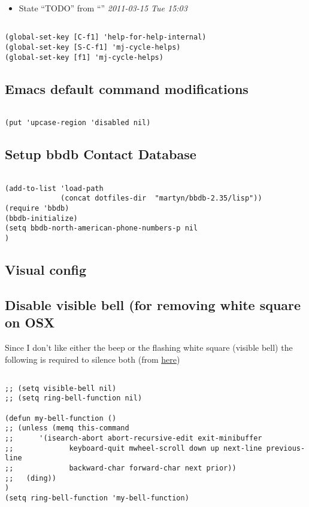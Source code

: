 \documentclass[colorlinks=true,urlcolor=blue,listings-sv]{article}
\begin{document}
\begin{itemize}
\item State ``TODO''       from ``''           \textit{2011-03-15 Tue 15:03}
\end{itemize}


\lstset{language=Lisp}
\begin{lstlisting}

(global-set-key [C-f1] 'help-for-help-internal)
(global-set-key [S-C-f1] 'mj-cycle-helps)
(global-set-key [f1] 'mj-cycle-helps)
\end{lstlisting}
\subsection{Emacs default command modifications}
\label{sec-1-10}



\lstset{language=Lisp}
\begin{lstlisting}

(put 'upcase-region 'disabled nil)
\end{lstlisting}
\subsection{Setup bbdb Contact Database}
\label{sec-1-11}
\label{8947b21f-9a13-4850-b1e6-01ac553d4c67}



\lstset{language=Lisp}
\begin{lstlisting}

(add-to-list 'load-path
             (concat dotfiles-dir  "martyn/bbdb-2.35/lisp"))
(require 'bbdb)
(bbdb-initialize)
(setq bbdb-north-american-phone-numbers-p nil
)
\end{lstlisting}
\subsection{Visual config}
\label{sec-1-12}
\subsection{Disable visible bell (for removing white square on OSX}
\label{sec-1-13}


Since I don't like either the beep or the flashing white square
(visible bell) the following is required to silence both (from \href{http://stackoverflow.com/questions/324457/disable-carbon-emacs-scroll-beep}{here})


\lstset{language=Lisp}
\begin{lstlisting}

;; (setq visible-bell nil)
;; (setq ring-bell-function nil)

(defun my-bell-function ()
;; (unless (memq this-command
;;      '(isearch-abort abort-recursive-edit exit-minibuffer
;;             keyboard-quit mwheel-scroll down up next-line previous-line
;;             backward-char forward-char next prior))
;;   (ding))
)
(setq ring-bell-function 'my-bell-function)
\end{lstlisting}
\end{document}
